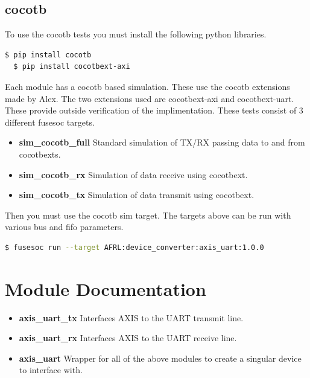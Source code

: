 \subsection{cocotb}
\par
To use the cocotb tests you must install the following python libraries.
\begin{lstlisting}[language=bash]
  $ pip install cocotb
  $ pip install cocotbext-axi
\end{lstlisting}

Each module has a cocotb based simulation. These use the cocotb extensions made by Alex.
The two extensions used are cocotbext-axi and cocotbext-uart. These provide outside verification
of the implimentation. These tests consist of 3 different fusesoc targets.

\begin{itemize}
  \item \textbf{sim\_cocotb\_full} Standard simulation of TX/RX passing data to and from cocotbexts.
  \item \textbf{sim\_cocotb\_rx} Simulation of data receive using cocotbext.
  \item \textbf{sim\_cocotb\_tx} Simulation of data transmit using cocotbext.
\end{itemize}

Then you must use the cocotb sim target. The targets above can be run with various bus and fifo parameters.
\begin{lstlisting}[language=bash]
  $ fusesoc run --target AFRL:device_converter:axis_uart:1.0.0
\end{lstlisting}

\newpage

\section{Module Documentation} \label{Module Documentation}

\begin{itemize}
\item \textbf{axis\_uart\_tx} Interfaces AXIS to the UART transmit line.\\
\item \textbf{axis\_uart\_rx} Interfaces AXIS to the UART receive line.\\
\item \textbf{axis\_uart} Wrapper for all of the above modules to create a singular device to interface with.\\
\end{itemize}


